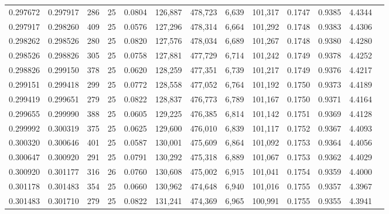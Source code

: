 \begin{tabular}{rrrrrrrrrrrrr}
0.297672 & 0.297917 &   286 &  25 &                                     0.0804 & 126,887 & 478,723 &   6,639 & 101,317 & 0.1747 & 0.9385 & 4.4344 \\
0.297917 & 0.298260 &   409 &  25 &                                     0.0576 & 127,296 & 478,314 &   6,664 & 101,292 & 0.1748 & 0.9383 & 4.4306 \\
0.298262 & 0.298526 &   280 &  25 &                                     0.0820 & 127,576 & 478,034 &   6,689 & 101,267 & 0.1748 & 0.9380 & 4.4280 \\
0.298526 & 0.298826 &   305 &  25 &                                     0.0758 & 127,881 & 477,729 &   6,714 & 101,242 & 0.1749 & 0.9378 & 4.4252 \\
0.298826 & 0.299150 &   378 &  25 &                                     0.0620 & 128,259 & 477,351 &   6,739 & 101,217 & 0.1749 & 0.9376 & 4.4217 \\
0.299151 & 0.299418 &   299 &  25 &                                     0.0772 & 128,558 & 477,052 &   6,764 & 101,192 & 0.1750 & 0.9373 & 4.4189 \\
0.299419 & 0.299651 &   279 &  25 &                                     0.0822 & 128,837 & 476,773 &   6,789 & 101,167 & 0.1750 & 0.9371 & 4.4164 \\
0.299655 & 0.299990 &   388 &  25 &                                     0.0605 & 129,225 & 476,385 &   6,814 & 101,142 & 0.1751 & 0.9369 & 4.4128 \\
0.299992 & 0.300319 &   375 &  25 &                                     0.0625 & 129,600 & 476,010 &   6,839 & 101,117 & 0.1752 & 0.9367 & 4.4093 \\
0.300320 & 0.300646 &   401 &  25 &                                     0.0587 & 130,001 & 475,609 &   6,864 & 101,092 & 0.1753 & 0.9364 & 4.4056 \\
0.300647 & 0.300920 &   291 &  25 &                                     0.0791 & 130,292 & 475,318 &   6,889 & 101,067 & 0.1753 & 0.9362 & 4.4029 \\
0.300920 & 0.301177 &   316 &  26 &                                     0.0760 & 130,608 & 475,002 &   6,915 & 101,041 & 0.1754 & 0.9359 & 4.4000 \\
0.301178 & 0.301483 &   354 &  25 &                                     0.0660 & 130,962 & 474,648 &   6,940 & 101,016 & 0.1755 & 0.9357 & 4.3967 \\
0.301483 & 0.301710 &   279 &  25 &                                     0.0822 & 131,241 & 474,369 &   6,965 & 100,991 & 0.1755 & 0.9355 & 4.3941 \\

\end{tabular}
